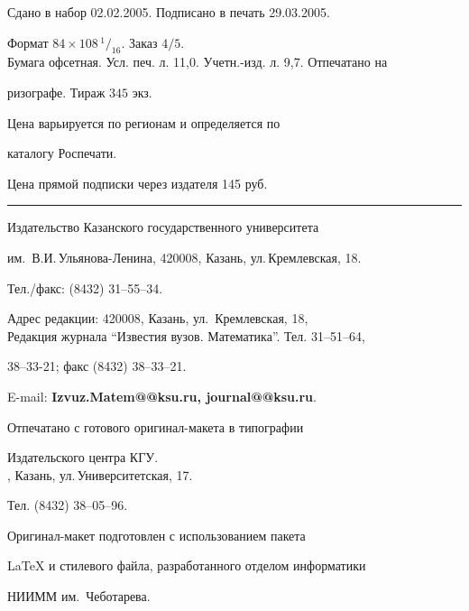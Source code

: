 \noindent Сдано в набор 02.02.2005. Подписано в печать 29.03.2005.


Формат $84\times 108 \,^1/_{16}.$ Заказ $4/5$.\\


Бумага офсетная. Усл. печ. л. 11,0. Учетн.-изд. л. 9,7. Отпечатано на 


ризографе. Тираж $345$ экз. 





\noindent Цена варьируется по регионам и определяется по 


каталогу Роспечати. 





\noindent Цена прямой подписки через издателя 145 руб. 


\bigskip


\hrule


\bigskip


\noindent Издательство Казанского государственного университета


им.~В.И.\,Ульянова-Ленина, 420008, Казань, ул.\,Кремлевская, 18.


Тел./факс: (8432) 31--55--34.\\


\smallskip





\noindent Адрес редакции: 420008, Казань, ул.~Кремлевская, 18,\\  


Редакция журнала  ``Известия вузов. Математика''. Тел. 31--51--64,


38--33-21; факс (8432) 38--33--21.





\noindent E-mail: {\bf Izvuz.Matem@@ksu.ru, journal@@ksu.ru}. \par


\bigskip 


\noindent Отпечатано с готового оригинал-макета в типографии


Издательского центра КГУ. \\





, Казань, ул.\,Университетская, 17.


Тел. (8432) 38--05--96. \par


\bigskip


\noindent Оригинал-макет подготовлен с использованием пакета


\AmS\LaTeX{} и стилевого файла, разработанного отделом информатики


НИИММ им.~Чеботарева.









